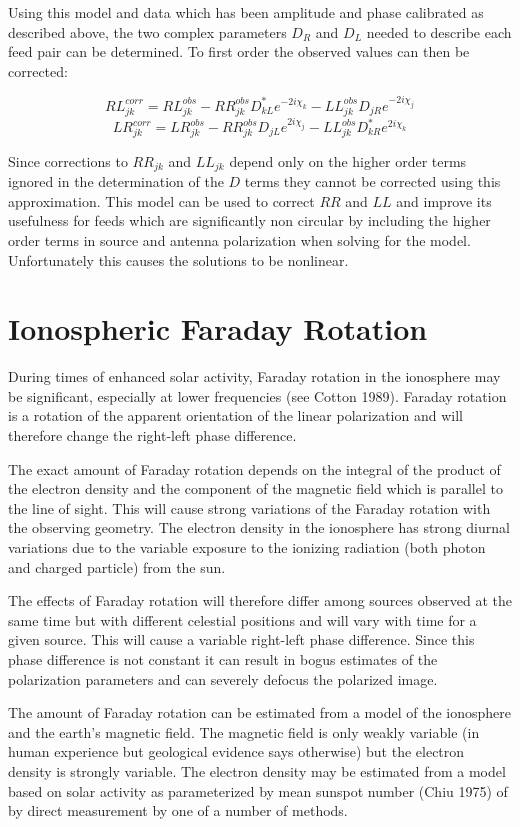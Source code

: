 Using this model and data which has been amplitude and phase
calibrated as described above, the two complex parameters $D_R$ and
$D_L$ needed to describe each feed pair can be determined.  To first
order the observed values can then be corrected:

$$ RL^{corr}_{jk} = RL^{obs}_{jk} - RR^{obs}_{jk}
D^*_{kL}e^{-2i\chi_k} - LL^{obs}_{jk} D_{jR}e^{-2i\chi_j} $$ $$
LR^{corr}_{jk} = LR^{obs}_{jk} - RR^{obs}_{jk} D_{jL}e^{2i\chi_j} -
LL^{obs}_{jk} D^*_{kR}e^{2i\chi_k} $$

Since corrections to $RR_{jk}$ and $LL_{jk}$ depend only on the higher
order terms ignored in the determination of the $D$ terms they cannot
be corrected using this approximation.  This model can be used to
correct $RR$ and $LL$ and improve its usefulness for feeds which are
significantly non circular by including the higher order terms in
source and antenna polarization when solving for the model.
Unfortunately this causes the solutions to be nonlinear.

\section{Ionospheric Faraday Rotation}

   During times of enhanced solar activity, Faraday rotation in the
ionosphere may be significant, especially at lower frequencies (see
Cotton 1989).  Faraday rotation is a rotation of the apparent
orientation of the linear polarization and will therefore change the
right-left phase difference.

   The exact amount of Faraday rotation depends on the integral of the
product of the electron density and the component of the magnetic
field which is parallel to the line of sight.  This will cause strong
variations of the Faraday rotation with the observing geometry.  The
electron density in the ionosphere has strong diurnal variations due
to the variable exposure to the ionizing radiation (both photon and
charged particle) from the sun.

   The effects of Faraday rotation will therefore differ among
sources observed at the same time but with different celestial
positions and will vary with time for a given source.  This will cause
a variable right-left phase difference.  Since this phase difference
is not constant it can result in bogus estimates of the polarization
parameters and can severely defocus the polarized image.

   The amount of Faraday rotation can be estimated from a model of the
ionosphere and the earth's magnetic field.  The magnetic field is only
weakly variable (in human experience but geological evidence says
otherwise) but the electron density is strongly variable.  The
electron density may be estimated from a model based on solar activity
as parameterized by mean sunspot number (Chiu 1975) of by direct
measurement by one of a number of methods.

